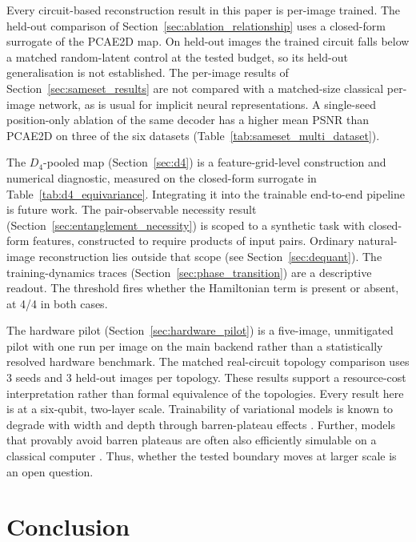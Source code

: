 \documentclass[pdflatex,sn-basic]{sn-jnl}
\begin{document}
Every circuit-based reconstruction result in this paper is per-image trained.
The held-out comparison of Section~\ref{sec:ablation_relationship} uses a closed-form surrogate of the PCAE2D map.
On held-out images the trained circuit falls below a matched random-latent control at the tested budget, so its held-out generalisation is not established.
The per-image results of Section~\ref{sec:sameset_results} are not compared with a matched-size classical per-image network, as is usual for implicit neural representations.
A single-seed position-only ablation of the same decoder has a higher mean PSNR than PCAE2D on three of the six datasets (Table~\ref{tab:sameset_multi_dataset}).

The $D_4$-pooled map (Section~\ref{sec:d4}) is a feature-grid-level construction and numerical diagnostic, measured on the closed-form surrogate in Table~\ref{tab:d4_equivariance}.
Integrating it into the trainable end-to-end pipeline is future work.
The pair-observable necessity result (Section~\ref{sec:entanglement_necessity}) is scoped to a synthetic task with closed-form features, constructed to require products of input pairs.
Ordinary natural-image reconstruction lies outside that scope (see Section~\ref{sec:dequant}).
The training-dynamics traces (Section~\ref{sec:phase_transition}) are a descriptive readout.
The threshold fires whether the Hamiltonian term is present or absent, at 4/4 in both cases.

The hardware pilot (Section~\ref{sec:hardware_pilot}) is a five-image, unmitigated pilot with one run per image on the main backend rather than a statistically resolved hardware benchmark.
The matched real-circuit topology comparison uses 3 seeds and 3 held-out images per topology.
These results support a resource-cost interpretation rather than formal equivalence of the topologies.
Every result here is at a six-qubit, two-layer scale.
Trainability of variational models is known to degrade with width and depth through barren-plateau effects \citep{McClean2018, Larocca2025}.
Further, models that provably avoid barren plateaus are often also efficiently simulable on a classical computer \citep{Cerezo2025}.
Thus, whether the tested boundary moves at larger scale is an open question.

\section{Conclusion}
\label{sec:conclusion}
\end{document}
